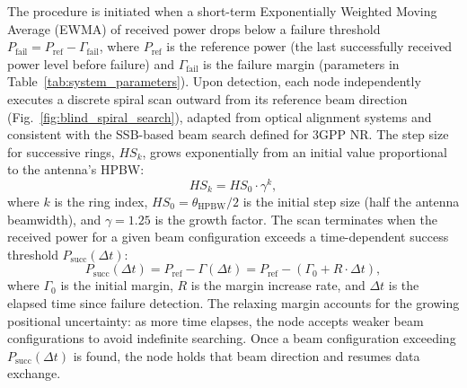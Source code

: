 \documentclass[fleqn,10pt]{wlscirep}
\newcommand{\rev}[1]{{\color{revblue}#1}}
\begin{document}
The procedure is initiated when a short-term Exponentially Weighted Moving Average (EWMA) of received power drops below a failure threshold $P_{\text{fail}} = P_{\text{ref}} - \Gamma_{\text{fail}}$, where $P_{\text{ref}}$ is the reference power (the last successfully received power level before failure) and $\Gamma_{\text{fail}}$ is the failure margin (parameters in Table~\ref{tab:system_parameters}). Upon detection, each node independently executes a discrete spiral scan outward from its reference beam direction (Fig.~\ref{fig:blind_spiral_search}), adapted from optical alignment systems\cite{photonics11060540} \rev{and consistent with the SSB-based beam search defined for 3GPP NR\cite{Giordani2018ATO, Heng2021SixChallenges}}. The step size for successive rings, $HS_k$, grows exponentially from an initial value proportional to the antenna's HPBW:
\begin{equation}
    HS_k = HS_0 \cdot \gamma^k,
\end{equation}
where $k$ is the ring index, $HS_0 = \theta_{\text{HPBW}}/2$ is the initial step size (half the antenna beamwidth), and $\gamma = 1.25$ is the growth factor. The scan terminates when the received power for a given beam configuration exceeds a time-dependent success threshold $P_{\text{succ}}(\Delta t)$:
\begin{equation}
    P_{\text{succ}}(\Delta t) = P_{\text{ref}} - \Gamma(\Delta t) = P_{\text{ref}} - (\Gamma_{0} + R \cdot \Delta t),
\end{equation}
where $\Gamma_{0}$ is the initial margin, $R$ is the margin increase rate, and $\Delta t$ is the elapsed time since failure detection. The relaxing margin accounts for the growing positional uncertainty: as more time elapses, the node accepts weaker beam configurations to avoid indefinite searching. Once a beam configuration exceeding $P_{\text{succ}}(\Delta t)$ is found, the node holds that beam direction and resumes data exchange.
\end{document}
